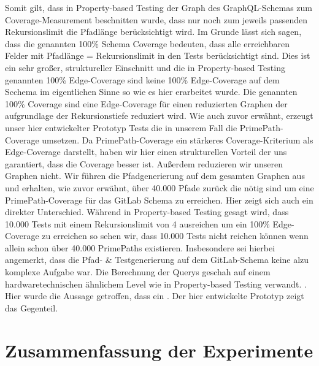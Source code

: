 Somit gilt, dass in Property-based Testing der Graph des GraphQL-Schemas zum Coverage-Measurement beschnitten wurde, dass nur noch zum jeweils passenden
Rekursionslimit die Pfadlänge berücksichtigt wird.
Im Grunde lässt sich sagen, dass die genannten 100\% Schema Coverage bedeuten, dass alle erreichbaren Felder mit Pfadlänge = Rekursionslimit
in den Tests berücksichtigt sind.
Dies ist ein sehr großer, struktureller Einschnitt und die in Property-based Testing genannten 100\% Edge-Coverage sind keine
100\% Edge-Coverage auf dem Scchema im eigentlichen Sinne so wie es hier erarbeitet wurde.
Die genannten 100\% Coverage sind eine Edge-Coverage für einen reduzierten Graphen der aufgrundlage der
Rekursionstiefe reduziert wird.
Wie auch zuvor erwähnt, erzeugt unser hier entwickelter Prototyp Tests die in unserem Fall die PrimePath-Coverage umsetzen.
Da PrimePath-Coverage ein stärkeres Coverage-Kriterium als Edge-Coverage darstellt, haben wir hier einen strukturellen Vorteil
der uns garantiert, dass die Coverage besser ist.
Außerdem reduzieren wir unseren Graphen nicht.
Wir führen die Pfadgenerierung auf dem gesamten Graphen aus und erhalten, wie zuvor erwähnt, über 40.000 Pfade zurück die nötig sind
um eine PrimePath-Coverage für das GitLab Schema zu erreichen.
Hier zeigt sich auch ein direkter Unterschied.
Während in Property-based Testing gesagt wird, dass 10.000 Tests mit einem Rekursionslimit von 4 ausreichen um ein 100\% Edge-Coverage zu erreichen \cite[vgl. Table 1]{property-based-testing}
so sehen wir, dass 10.000 Tests nicht reichen können wenn allein schon über 40.000 PrimePaths existieren.
Insbesondere sei hierbei angemerkt, dass die Pfad- \& Testgenerierung auf dem GitLab-Schema keine alzu komplexe Aufgabe war.
Die Berechnung der Querys geschah auf einem hardwaretechnischen ähnlichem Level wie in Property-based Testing verwandt. \cite[vgl. Experimental Setup]{property-based-testing}.
Hier wurde die Aussage getroffen, dass ein \cite[Tiefensuchen Ansatz nicht skaliert und deswegen ein iterativer Ansatz zu präferieren ist]{property-based-testing}.
Der hier entwickelte Prototyp zeigt das Gegenteil.

\section{Zusammenfassung der Experimente}

